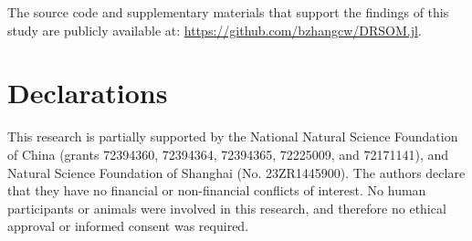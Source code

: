 The source code and supplementary materials that support the findings of this study are publicly available at: \url{https://github.com/bzhangcw/DRSOM.jl}.


\section*{Declarations}

This research is partially supported by the National Natural Science Foundation
of China (grants 72394360, 72394364, 72394365, 72225009, and 72171141), and Natural Science Foundation of Shanghai (No. 23ZR1445900). The authors declare that they have no financial or non-financial conflicts of interest. No human participants or animals were involved in this research, and therefore no ethical approval or informed consent was required.





\clearpage










